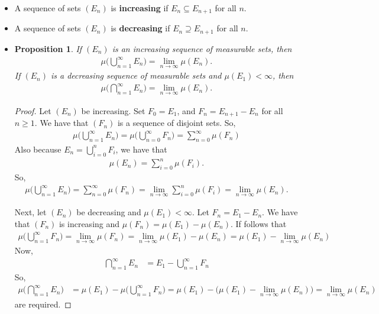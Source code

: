 \documentclass[10pt]{article}
\newtheorem{proposition}[lemma]{Proposition}
\begin{document}
\begin{itemize}
  \item A sequence of sets $(E_n)$ is {\bf increasing} if $E_n \subseteq E_{n+1}$ for all $n$.
  
  \item A sequence of sets $(E_n)$ is {\bf decreasing} if $E_{n} \supseteq E_{n+1}$ for all $n$.
  
  \item \begin{proposition}
  If $(E_n)$ is an increasing sequence of measurable sets, then
  \begin{align*}
      \mu\bigg( \bigcup_{n=1}^\infty E_n \bigg) = \lim_{n\rightarrow \infty} \mu(E_n).
  \end{align*}
  If $(E_n)$ is a decreasing sequence of measurable sets and $\mu(E_1) < \infty$, then
  \begin{align*}
    \mu\bigg( \bigcap_{n=1}^\infty E_n \bigg) = \lim_{n\rightarrow \infty} \mu(E_n).
  \end{align*}
  \end{proposition}

  \begin{proof}
    Let $(E_n)$ be increasing. Set $F_0 = E_1$, and $F_n = E_{n+1} - E_n$ for all $n \geq 1$. We have that $(F_n)$ is a sequence of disjoint sets. So,
    \begin{align*}
      \mu \bigg( \bigcup_{n=1}^\infty E_n \bigg)
      = \mu \bigg( \bigcup_{n=0}^\infty F_n \bigg)
      = \sum_{n=0}^\infty \mu(F_n)
    \end{align*}
    Also because $E_n = \bigcup_{i=0}^n F_i$, we have that
    \begin{align*}
        \mu(E_n) = \sum_{i=0}^n \mu(F_i).
    \end{align*}
    So,
    \begin{align*}
      \mu \bigg( \bigcup_{n=1}^\infty E_n \bigg)
      = \sum_{n=0}^\infty \mu(F_n)
      = \lim_{n \rightarrow \infty} \sum_{i=0}^n \mu(F_i)
      = \lim_{n \rightarrow \infty} \mu(E_n).
    \end{align*}

    Next, let $(E_n)$ be decreasing and $\mu(E_1) < \infty$. Let $F_n = E_1 - E_n$. We have that $(F_n)$ is increasing and $\mu(F_n) = \mu(E_1) - \mu(E_n)$. If follows that
    \begin{align*}
      \mu\bigg( \bigcup_{n=1}^\infty F_n \bigg) 
      = \lim_{n \rightarrow \infty} \mu(F_n) 
      = \lim_{n \rightarrow \infty} \mu(E_1) - \mu(E_n)
      = \mu(E_1) - \lim_{n \rightarrow \infty} \mu(E_n)
    \end{align*}
    Now, 
    \begin{align*}
      \bigcap_{n=1}^\infty E_n
      &= E_1 - \bigcup_{n=1}^\infty F_n
    \end{align*}
    So,
    \begin{align*}
      \mu\bigg( \bigcap_{n=1}^\infty E_n \bigg)
      &= \mu(E_1) - \mu\bigg( \bigcup_{n=1}^\infty F_n \bigg) 
      = \mu(E_1) - \bigg( \mu(E_1) - \lim_{n \rightarrow \infty} \mu(E_n) \bigg)
      = \lim_{n \rightarrow \infty} \mu(E_n)
    \end{align*}
    are required. 
  \end{proof}


\end{itemize}
\end{document}
